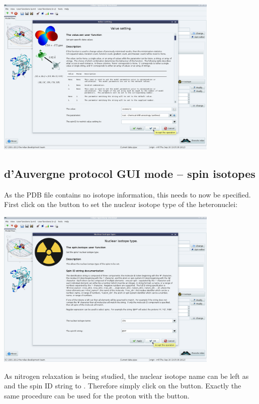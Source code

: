\begin{htmlonly}
\begin{htmlonly}
\begin{minipage}[h]{\linewidth}
\centerline{\includegraphics[width=0.8\textwidth, bb=14 14 1415 1019]{graphics/screenshots/mf_analysis/csa_wizard}}
\end{minipage}



\subsection{d'Auvergne protocol GUI mode -- spin isotopes}

As the PDB file contains no isotope information, this needs to now be specified.  First click on the  button to set the nuclear isotope type of the heteronuclei:

\begin{minipage}[h]{\linewidth}
\centerline{\includegraphics[width=0.8\textwidth, bb=14 14 1415 1019]{graphics/screenshots/mf_analysis/x_isotope}}
\end{minipage}

As nitrogen relaxation is being studied, the nuclear isotope name can be left as  and the spin ID string to .  Therefore simply click on the  button.  Exactly the same procedure can be used for the proton with the  button.



\end{htmlonly}
\end{htmlonly}
